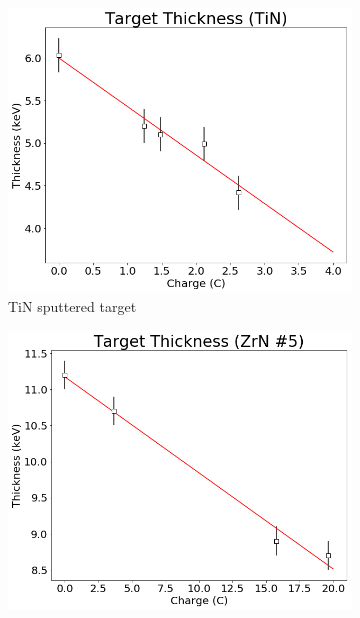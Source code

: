 \begin{figure}
     \centering
        \begin{subfigure}[b]{0.475\textwidth}
            \centering
            \includegraphics[width=\textwidth]{figures/targetThickness0.png}
            \caption[TiN sputtered target]%
            {{\small TiN sputtered target}}    
            \label{fig: target0}
        \end{subfigure}
        \hfill
        \begin{subfigure}[b]{0.475\textwidth}  
            \centering 
            \includegraphics[width=\textwidth]{figures/targetThickness5.png}

\end{subfigure}
\end{figure}
